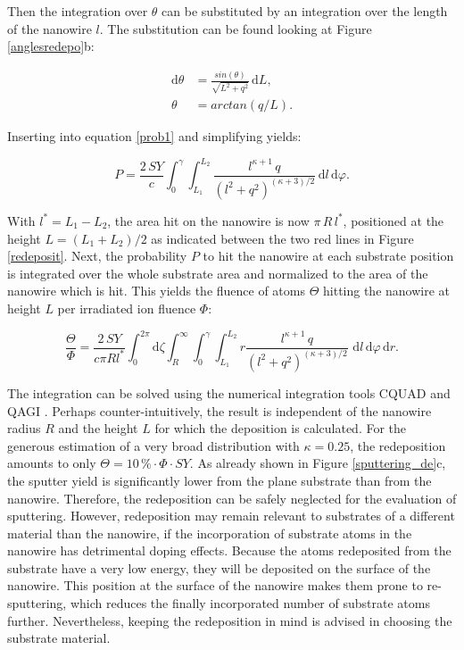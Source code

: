 Then the integration over $\theta$ can be substituted by an integration over the length of the nanowire $l$. The substitution can be found looking at Figure \ref{anglesredepo}b:

\begin{align*}
\mathrm{d}\theta &= \frac{sin(\theta)}{\sqrt{L^2 + q^2}}\,\mathrm{d}L,\\
\theta &= arctan(q/L).
\end{align*}

Inserting into equation \ref{prob1} and simplifying yields:

\begin{equation}
\label{prob2}
P = \frac{2\,SY}{c} \int_0^{\gamma} \! \int_{L_1}^{L_2} \!  \frac{l^{\kappa+1}\,q}{(l^2 + q^2)^{(\kappa + 3)/2}} \,\mathrm{d}l \, \mathrm{d}\varphi.
\end{equation}

With $l^*=L_1-L_2$, the area hit on the nanowire is now $\pi \, R \, l^*$, positioned at the height $L= (L_1+L_2)/2$ as indicated between the two red lines in Figure \ref{redeposit}. Next, the probability $P$ to hit the nanowire at each substrate position is integrated over the whole substrate area and normalized to the area of the nanowire which is hit. This yields the fluence of atoms $\Theta$ hitting the nanowire at height $L$ per irradiated ion fluence $\Phi$:

\begin{equation}
\label{prob3}
\frac{\Theta}{\Phi} = \frac{2\,SY}{c \pi Rl^*} \int_0^{2\pi}\! \mathrm{d}\zeta \int_R^{\infty} \!
\int_0^{\gamma} \! \int_{L_1}^{L_2} \! r \frac{l^{\kappa+1}\,q}{(l^2 + q^2)^{(\kappa + 3)/2}}\,\,\mathrm{d}l \, \mathrm{d}\varphi\,\mathrm{d}r.
\end{equation}

The integration can be solved using the numerical integration tools CQUAD and QAGI \cite{gough_gnu_2009}. Perhaps counter-intuitively, the result is independent of the nanowire radius $R$ and the height $L$ for which the deposition is calculated. For the generous estimation of a very broad distribution with $\kappa = 0.25$, the redeposition amounts to only $\Theta =10\,\% \cdot \Phi\cdot SY$. As already shown in Figure \ref{sputtering_de}c, the sputter yield is significantly lower from the plane substrate than from the nanowire. Therefore, the redeposition can be safely neglected for the evaluation of sputtering. However, redeposition may remain relevant to substrates of a different material than the nanowire, if the incorporation of substrate atoms in the nanowire has detrimental doping effects. Because the atoms redeposited from the substrate have a very low energy, they will be deposited on the surface of the nanowire. This position at the surface of the nanowire makes them prone to re-sputtering, which reduces the finally incorporated number of substrate atoms further. Nevertheless, keeping the redeposition in mind is advised in choosing the substrate material.


